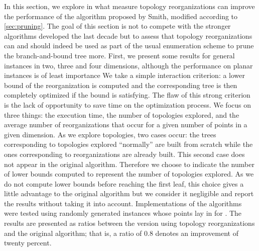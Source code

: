 \documentclass{article}
\theoremstyle{plain}
\begin{document}
In this section, we explore in what measure topology reorganizations can improve the performance of the algorithm proposed by Smith, modified according to \cref{sec:pruning}. 
The goal of this section is not to compete with the stronger algorithms \cite{Fampa}\cite{Fonseca}\cite{Laarhoven} developed the last decade but to assess that topology reorganizations can and should indeed be used as part of the usual enumeration scheme to prune the branch-and-bound tree more.     
First, we present some results for general instances in two, three and four dimensions, although the performance on planar instances is of least importance 
We take a simple interaction criterion: a lower bound of the reorganization is computed and the corresponding tree is then completely optimized if the bound is satisfying. 
The flaw of this strong criterion is the lack of opportunity to save time on the optimization process. 
We focus on three things: the execution time, the number of topologies explored, and the average number of reorganizations that occur for a given number of points in a given dimension. 
As we explore topologies, two cases occur: the trees corresponding to topologies explored ``normally'' are built from scratch while the ones corresponding to reorganizations are already built. 
This second case does not appear in the original algorithm.
Therefore we choose to indicate the number of lower bounds computed to represent the number of topologies explored.
As we do not compute lower bounds before reaching the first leaf, this choice gives a little advantage to the original algorithm but we consider it negligible and report the results without taking it into account.
Implementations of the algorithms were tested using randomly generated instances whose points lay in  for . 
The results are presented as ratios between the version using topology reorganizations and the original algorithm; 
that is, a ratio of 0.8 denotes an improvement of twenty percent.
\end{document}
